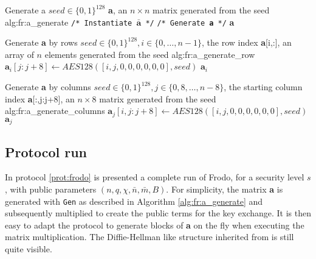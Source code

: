 \begin{b_algorithm}{Generate a}
{$seed \in \{0,1\}^{128}$}
{\textbf{a}, an $n\times n$ matrix generated from the seed}
{alg:fr:a_generate}
\STATE \texttt{/* Instantiate $\bar{\textbf{a}}$ */}
\ENDFOR
\STATE \texttt{/* Generate \textbf{a} */}
\ENDFOR
\RETURN \textbf{a}
\end{b_algorithm}

\begin{b_algorithm}{Generate \textbf{a} by rows}
{$seed \in \{0,1\}^{128},i \in \{0,\ldots,n-1\}$, the row index}
{\textbf{a}[i,:], an array of $n$ elements generated from the seed}
{alg:fr:a_generate_row}
\STATE $\textbf{a}_i[j:j+8] \gets AES128([i,j,0,0,0,0,0,0], seed)$
\ENDFOR
\RETURN $\textbf{a}_i$
\end{b_algorithm}

\begin{b_algorithm}{Generate \textbf{a} by columns}
{$seed \in \{0,1\}^{128}, j\in \{0,8,\ldots,n-8\}$, the starting column index}
{\textbf{a}[:,j:j+8], an $n\times 8$ matrix generated from the seed}
{alg:fr:a_generate_columns}
\STATE $\textbf{a}_j[i,j:j+8] \gets AES128([i,j,0,0,0,0,0,0], seed)$
\ENDFOR
\RETURN $\textbf{a}_j$
\end{b_algorithm}

\subsection{Protocol run}
In protocol \ref{prot:frodo} is presented a complete run of Frodo, for a security level $s$, with public parameters $(n,q,\chi,\bar{n},\bar{m},B)$. For simplicity, the matrix \textbf{a} is generated with \verb|Gen| as described in Algorithm \ref{alg:fr:a_generate} and subsequently multiplied to create the public terms for the key exchange. It is then  easy to adapt the protocol to generate blocks of \textbf{a} on the fly when executing the matrix multiplication. The Diffie-Hellman like structure inherited from \cite{BCNS} is still quite visible.\\

